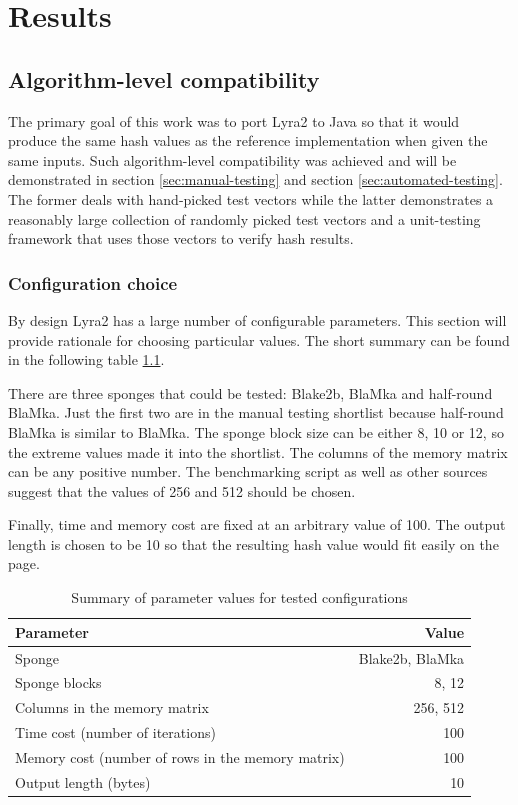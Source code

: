 \chapter{Results}
\label{sec:results}

\section{Algorithm-level compatibility}

The primary goal of this work was to port Lyra2 to Java so that it would produce the same hash values as the reference implementation when given the same inputs. Such algorithm-level compatibility was achieved and will be demonstrated in section \ref{sec:manual-testing} and section \ref{sec:automated-testing}. The former deals with hand-picked test vectors while the latter demonstrates a reasonably large collection of randomly picked test vectors and a unit-testing framework that uses those vectors to verify hash results.

\subsection{Configuration choice}
By design Lyra2 has a large number of configurable parameters. This section will provide rationale for choosing particular values. The short summary can be found in the following table \ref{table:configuration-summary}.

There are three sponges that could be tested: Blake2b, BlaMka and half-round BlaMka. Just the first two are in the manual testing shortlist because half-round BlaMka is similar to BlaMka. The sponge block size can be either 8, 10 or 12, so the extreme values made it into the shortlist. The columns of the memory matrix can be any positive number. The  benchmarking script as well as other sources suggest that the values of 256 and 512 should be chosen.

Finally, time and memory cost are fixed at an arbitrary value of 100. The output length is chosen to be 10 so that the resulting hash value would fit easily on the page.

\begin{table}
\begin{center}
\begin{tabular}{l r}
Parameter & Value \\ \hline
Sponge & Blake2b, BlaMka \\
Sponge blocks & 8, 12 \\
Columns in the memory matrix & 256, 512 \\
Time cost (number of iterations) & 100 \\
Memory cost (number of rows in the memory matrix) & 100 \\
Output length (bytes) & 10 \\
\end{tabular}
\end{center}
\caption{Summary of parameter values for tested configurations}
\label{table:configuration-summary}
\end{table}

